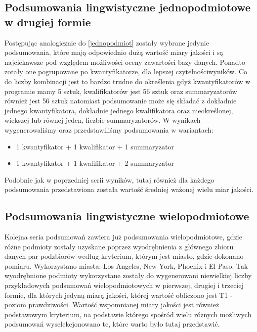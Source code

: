 \documentclass{classrep}
\begin{document}
{        \subsection{Podsumowania lingwistyczne jednopodmiotowe w drugiej formie} {
            Postępując analogicznie do \ref{jednopodmiot} zostały wybrane jedynie podsumowania,
            które mają odpowiednio dużą wartość miary jakości i są najciekawsze pod względem
            możliwości oceny zawartości bazy danych.  Ponadto zotały one pogrupowane po
            kwantyfikatorze, dla lepszej czytelnościwyników. Co do liczby kombinacji jest to bardzo
            trudne do określenia gdyż kwantyfikatorów w programie mamy 5 sztuk, kwalifikatorów jest
            56 sztuk oraz summaryzatorów również jest 56 sztuk natomiast podsumowanie może się
            składać z dokładnie jednego kwantyfikatora, dokładnie jednego kwalifikatora oraz
            nieokreślonej, wiekszej lub równej jeden, liczbie summaryzatorów.  W wynikach
            wygenerowaliśmy oraz przedstawiliśmy podsumowania w wariantach:
            \begin{itemize}
                \item 1 kwantyfikator + 1 kwalifikator + 1 summaryzator
                \item 1 kwantyfikator + 1 kwalifikator + 2 summaryzator
            \end{itemize}
            Podobnie jak w poprzedniej serii wyników, tutaj również dla każdego podsumowania
            przedstawiona została wartość średniej ważonej wielu miar jakości.
        }

        \subsection{Podsumowania lingwistyczne wielopodmiotowe} {
            Kolejna seria podsumowań zawiera już podsumowania wielopodmiotowe, gdzie różne podmioty
            zostały uzyskane poprzez wyodrębnienia z głównego zbioru danych par podzbiorów według
            kryterium, którym jest miasto, gdzie dokonano pomiaru. Wykorzystano miasta: Los Angeles,
            New York, Phoenix i El Paso. Tak wyodrębnione podmioty wykorzystane zostały do
            wygenerowani niewielkiej liczby przykładowych podsumowań wielopodmiotowych w pierwszej,
            drugiej i trzeciej formie, dla których jedyną miarą jakości, której wartość obliczono
            jest T1 - poziom prawdziwości.  Wartość wspomnianej miary jakości jest również
            podstawowym kryterium, na podstawie którego spośród wielu różnych możliwych podsumowań
            wyselekcjonowano te, które warto było tutaj przedstawić.
        }

    }
\end{document}
